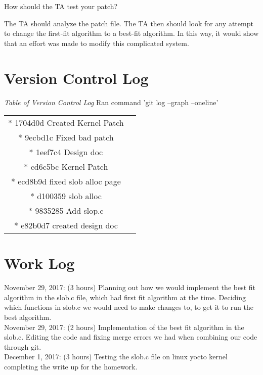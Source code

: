 \documentclass{article}
\newenvironment{question}[2][Question]{\begin{trivlist}
\item[\hskip \labelsep {\bfseries #1}\hskip \labelsep {\bfseries #2.}]}{\end{trivlist}}
\begin{document}

\vspace{0.25in}
\begin{question}{5}
How should the TA test your patch?
\end{question}
The TA should analyze the patch file. The TA then should look for any attempt to change the first-fit algorithm to a best-fit algorithm. In this way, it would show that an effort was made to modify this complicated system.



\section*{Version Control Log}
\textit{Table of Version Control Log} Ran command 'git log --graph --oneline'
\newline
\begin{center}
\begin{tabular}{ c c }
* 1704d0d Created Kernel Patch \\
* 9ecbd1c Fixed bad patch \\
* 1eef7c4 Design doc \\
* cd6c5bc Kernel Patch \\
* ecd8b9d fixed slob alloc page \\
* d100359 slob alloc \\
* 9835285 Add slop.c \\
* e82b0d7 created design doc
\end{tabular}
\end{center}

\section*{Work Log}
November 29, 2017: (3 hours) Planning out how we would implement the best fit algorithm in the slob.c file, which had first fit algorithm at the time. Deciding which functions in slob.c we would need to make changes to, to get it to run the best algorithm.  \\
November 29, 2017: (2 hours) Implementation of the best fit algorithm in the slob.c. Editing the code and fixing merge errors we had when combining our code through git. \\
December 1, 2017: (3 hours) Testing the slob.c file on linux yocto kernel completing the write up for the homework.
\end{document}

